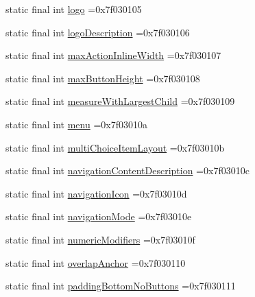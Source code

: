 \begin{DoxyCompactItemize}
\item 
static final int \mbox{\hyperlink{classbr_1_1unb_1_1cic_1_1mp_1_1marketmaster_1_1R_1_1attr_aa6fc6535019961689bb68ae206e8b6d4}{logo}} =0x7f030105
\item 
static final int \mbox{\hyperlink{classbr_1_1unb_1_1cic_1_1mp_1_1marketmaster_1_1R_1_1attr_ab757f4175690bdd10e7cbfa20fde9e20}{logo\+Description}} =0x7f030106
\item 
static final int \mbox{\hyperlink{classbr_1_1unb_1_1cic_1_1mp_1_1marketmaster_1_1R_1_1attr_aaebabfe23bec2f76f2e54af1a54db4c2}{max\+Action\+Inline\+Width}} =0x7f030107
\item 
static final int \mbox{\hyperlink{classbr_1_1unb_1_1cic_1_1mp_1_1marketmaster_1_1R_1_1attr_ab8d562f26719352f71bdde8cb1908963}{max\+Button\+Height}} =0x7f030108
\item 
static final int \mbox{\hyperlink{classbr_1_1unb_1_1cic_1_1mp_1_1marketmaster_1_1R_1_1attr_a19384c0c052691ffbe6dce04dbe1c36c}{measure\+With\+Largest\+Child}} =0x7f030109
\item 
static final int \mbox{\hyperlink{classbr_1_1unb_1_1cic_1_1mp_1_1marketmaster_1_1R_1_1attr_a39f238492ccf7c1652903965350889cd}{menu}} =0x7f03010a
\item 
static final int \mbox{\hyperlink{classbr_1_1unb_1_1cic_1_1mp_1_1marketmaster_1_1R_1_1attr_ad7bdd11b927c020988b8ffe61121e1f3}{multi\+Choice\+Item\+Layout}} =0x7f03010b
\item 
static final int \mbox{\hyperlink{classbr_1_1unb_1_1cic_1_1mp_1_1marketmaster_1_1R_1_1attr_a83f462065403cdf3ee809989dd909ee8}{navigation\+Content\+Description}} =0x7f03010c
\item 
static final int \mbox{\hyperlink{classbr_1_1unb_1_1cic_1_1mp_1_1marketmaster_1_1R_1_1attr_a023354895e9df6d955bfc6211fccdc9a}{navigation\+Icon}} =0x7f03010d
\item 
static final int \mbox{\hyperlink{classbr_1_1unb_1_1cic_1_1mp_1_1marketmaster_1_1R_1_1attr_a7db9ea4e77f7a6f9e9568569fbc652c8}{navigation\+Mode}} =0x7f03010e
\item 
static final int \mbox{\hyperlink{classbr_1_1unb_1_1cic_1_1mp_1_1marketmaster_1_1R_1_1attr_afc8bd92bbafc6e49f737b878c61a1d4a}{numeric\+Modifiers}} =0x7f03010f
\item 
static final int \mbox{\hyperlink{classbr_1_1unb_1_1cic_1_1mp_1_1marketmaster_1_1R_1_1attr_a9ea885a1412d20483381096ed775bc73}{overlap\+Anchor}} =0x7f030110
\item 
static final int \mbox{\hyperlink{classbr_1_1unb_1_1cic_1_1mp_1_1marketmaster_1_1R_1_1attr_a124384687e76b7561cd82e77805e1e45}{padding\+Bottom\+No\+Buttons}} =0x7f030111

\end{DoxyCompactItemize}
